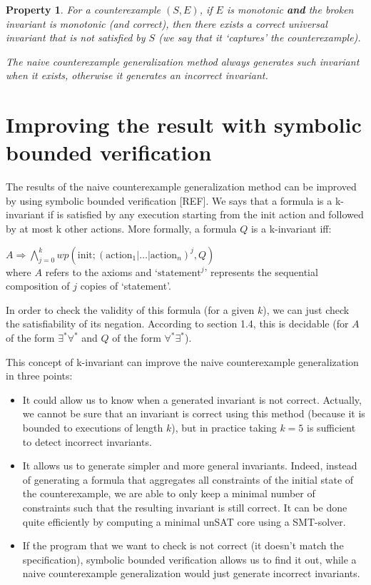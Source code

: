 \documentclass[11pt,a4paper,oldfontcommands,openany]{memoir}
\newtheorem*{property}{Property}
\begin{document}
    \begin{property}
        For a counterexample \((S,E)\), if \(E\) is monotonic \textbf{and} the broken invariant is monotonic (and correct),
        then there exists a correct universal invariant that is not satisfied by \(S\) (we say that it `captures' the counterexample).

        The naive counterexample generalization method always generates such invariant when it exists, otherwise it generates an incorrect invariant.
    \end{property}

    \section{Improving the result with symbolic bounded verification}

    The results of the naive counterexample generalization method can be improved by using symbolic bounded verification [REF].
    We says that a formula is a k-invariant if is satisfied by any execution starting from the init action and followed by at most k
    other actions. More formally, a formula \(Q\) is a k-invariant iff:

    \( A \Rightarrow \bigwedge\limits_{j=0}^k wp(\text{init}; (\text{action}_1|\ldots|\text{action}_n)^j, Q) \)\\
    where \(A\) refers to the axioms and `\(\text{statement}^j\)' represents the sequential composition of \(j\) copies of `statement'.

    In order to check the validity of this formula (for a given \(k\)), we can just check the satisfiability of its negation.
    According to section 1.4, this is decidable (for \(A\) of the form \(\exists^*\forall^*\) and \(Q\) of the form \(\forall^*\exists^*\)).

    This concept of k-invariant can improve the naive counterexample generalization in three points:
    \begin{itemize}
        \item It could allow us to know when a generated invariant is not correct.
        Actually, we cannot be sure that an invariant is correct using this method (because it is bounded to executions of length \(k\)),
        but in practice taking \(k=5\) is sufficient to detect incorrect invariants.
        \item It allows us to generate simpler and more general invariants. Indeed, instead of generating a formula that
        aggregates all constraints of the initial state of the counterexample, we are able to only keep a minimal number of constraints
        such that the resulting invariant is still correct. It can be done quite efficiently by computing a minimal unSAT core using a SMT-solver.
        \item If the program that we want to check is not correct (it doesn't match the specification), symbolic bounded verification
        allows us to find it out, while a naive counterexample generalization would just generate incorrect invariants.
    \end{itemize}
\end{document}
